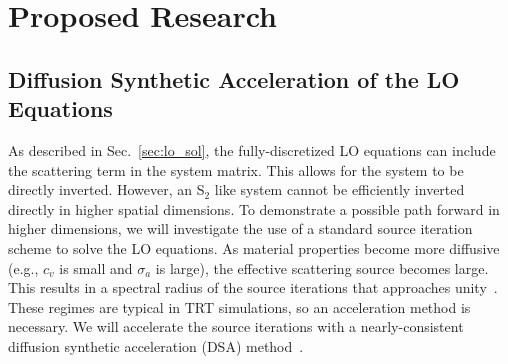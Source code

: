 \documentclass[11pt]{article}
\begin{document}
\section{Proposed Research}

\subsection{Diffusion Synthetic Acceleration of the LO Equations}

As described in Sec.~\ref{sec:lo_sol}, the fully-discretized LO equations can include
the scattering term in the system matrix.  This allows for the system to be directly
inverted.
However, an S$_2$ like system cannot be efficiently inverted
directly in higher spatial dimensions.  To demonstrate a possible path forward in
higher dimensions, we will investigate the use of a standard
source iteration scheme to solve the LO equations.  As
material properties become more diffusive (e.g., $c_v$ is small and $\sigma_a$ is
large), the effective scattering source becomes large.  This results in a spectral radius of the source iterations that approaches
unity~\cite{morel_newton}.  These regimes are typical in TRT simulations, so an
acceleration method is necessary.  We will accelerate the source iterations with a nearly-consistent diffusion synthetic acceleration
(DSA) method~\cite{wla,wla_thesis}.
\end{document}
